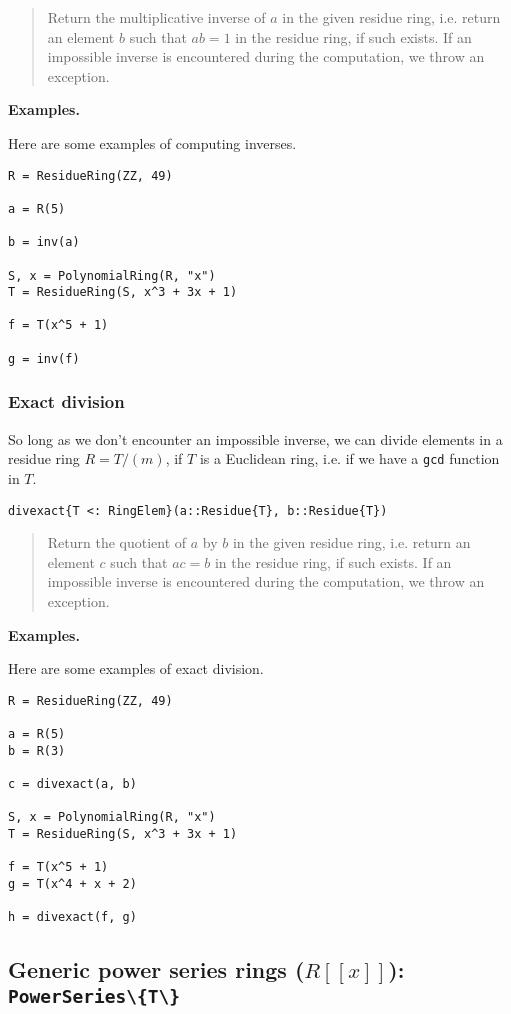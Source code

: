 \documentclass[a4paper,10pt]{article}
\newcommand{\code}{\lstinline}
\newcommand{\desc}[1]{\vspace{-3mm}\begin{quote}#1\end{quote}}
\begin{document}
\desc{Return the multiplicative inverse of $a$ in the given residue
ring, i.e. return an element $b$ such that $ab = 1$ in the residue ring,
if such exists. If an impossible inverse is encountered during the
computation, we throw an exception.}

\textbf{Examples.}

Here are some examples of computing inverses.

\begin{lstlisting}
R = ResidueRing(ZZ, 49)

a = R(5)

b = inv(a)

S, x = PolynomialRing(R, "x")
T = ResidueRing(S, x^3 + 3x + 1)

f = T(x^5 + 1)

g = inv(f)
\end{lstlisting}

\subsubsection{Exact division}

So long as we don't encounter an impossible inverse, we can
divide elements in a residue ring $R = T/(m)$, if $T$ is a
Euclidean ring, i.e. if we have a \code{gcd} function in $T$.

\begin{lstlisting}
divexact{T <: RingElem}(a::Residue{T}, b::Residue{T})
\end{lstlisting}

\desc{Return the quotient of $a$ by $b$ in the given residue
ring, i.e. return an element $c$ such that $ac = b$ in the residue ring,
if such exists. If an impossible inverse is encountered during the
computation, we throw an exception.}

\textbf{Examples.}

Here are some examples of exact division.

\begin{lstlisting}
R = ResidueRing(ZZ, 49)

a = R(5)
b = R(3)

c = divexact(a, b)

S, x = PolynomialRing(R, "x")
T = ResidueRing(S, x^3 + 3x + 1)

f = T(x^5 + 1)
g = T(x^4 + x + 2)

h = divexact(f, g)
\end{lstlisting}

\subsection{Generic power series rings ($R[[x]]$): \code|PowerSeries\{T\}|}
\end{document}
